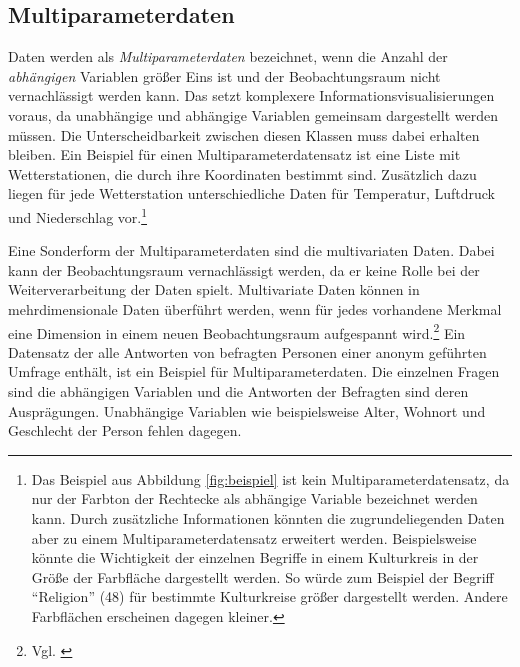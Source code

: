\documentclass[a4paper, 12pt, DIV=calc, version=first, pdftex, headsepline, footsepline, bibtotocnumbered, liststotocnumbered]{scrreprt}
\begin{document}
\subsection{Multiparameterdaten}
Daten werden als \textit{Multiparameterdaten} bezeichnet, wenn die Anzahl der \textit{abhängigen} Variablen größer Eins ist
und der Beobachtungsraum nicht vernachlässigt werden kann. Das setzt komplexere
Informationsvisualisierungen voraus, da unabhängige und abhängige Variablen gemeinsam
dargestellt werden müssen. Die Unterscheidbarkeit zwischen diesen Klassen muss dabei
erhalten bleiben.
Ein Beispiel für einen Multiparameterdatensatz ist eine Liste mit Wetterstationen, die durch ihre
Koordinaten bestimmt sind. Zusätzlich dazu liegen für jede Wetterstation unterschiedliche
Daten für Temperatur, Luftdruck und Niederschlag vor.\footnote{Das Beispiel aus Abbildung
\ref{fig:beispiel} ist kein Multiparameterdatensatz, da nur der Farbton der Rechtecke als
abhängige Variable bezeichnet werden kann. Durch zusätzliche Informationen könnten die
zugrundeliegenden Daten aber zu einem Multiparameterdatensatz erweitert werden. Beispielsweise
könnte die Wichtigkeit der einzelnen Begriffe in einem Kulturkreis in der Größe der
Farbfläche dargestellt werden. So würde zum Beispiel der Begriff "`Religion"' (48) für
bestimmte Kulturkreise größer dargestellt werden. Andere Farbflächen erscheinen dagegen
kleiner.}

Eine Sonderform der Multiparameterdaten sind die multivariaten Daten. Dabei kann
der Beobachtungsraum vernachlässigt werden, da er keine Rolle bei der Weiterverarbeitung
der Daten spielt. Multivariate Daten können in mehrdimensionale Daten überführt werden,
wenn für jedes vorhandene Merkmal eine Dimension in einem neuen Beobachtungsraum
aufgespannt wird.\footnote{Vgl. \citep[S.\,172]{Schumann}} Ein Datensatz der alle
Antworten von befragten Personen einer anonym geführten Umfrage enthält, ist ein Beispiel
für Multiparameterdaten. Die einzelnen Fragen sind die abhängigen Variablen und
die Antworten der Befragten sind deren Ausprägungen. Unabhängige Variablen wie beispielsweise
Alter, Wohnort und Geschlecht der Person fehlen dagegen.
\end{document}
